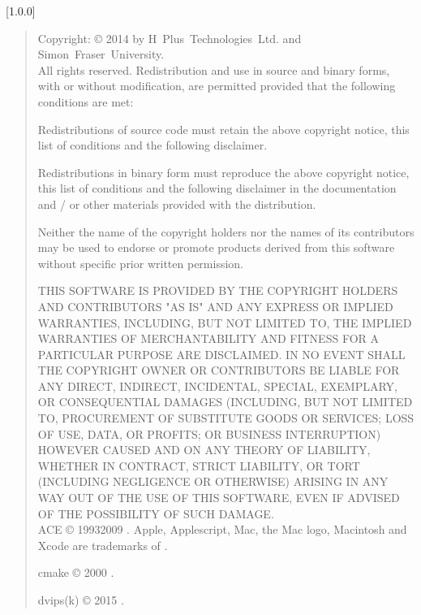 [1.0.0]
\begin{quote}
\begin{small}
Copyright: \copyright{} 2014 by H~Plus~Technologies~Ltd. and Simon~Fraser~University.
\\
All rights reserved. Redistribution and use in source and binary forms, with or without
modification, are permitted provided that the following conditions are met:
\begin{tightItems}
\item Redistributions of source code must retain the above copyright notice, this list of
conditions and the following disclaimer.
\item Redistributions in binary form must reproduce the above copyright notice, this list
of conditions and the following disclaimer in the documentation and / or other materials
provided with the distribution.
\item Neither the name of the copyright holders nor the names of its contributors may be
used to endorse or promote products derived from this software without specific prior
written permission.
\end{tightItems}
THIS SOFTWARE IS PROVIDED BY THE COPYRIGHT HOLDERS AND CONTRIBUTORS "AS IS" AND ANY
EXPRESS OR IMPLIED WARRANTIES, INCLUDING, BUT NOT LIMITED TO, THE IMPLIED WARRANTIES OF
MERCHANTABILITY AND FITNESS FOR A PARTICULAR PURPOSE ARE DISCLAIMED.
IN NO EVENT SHALL THE COPYRIGHT OWNER OR CONTRIBUTORS BE LIABLE FOR ANY DIRECT, INDIRECT,
INCIDENTAL, SPECIAL, EXEMPLARY, OR CONSEQUENTIAL DAMAGES (INCLUDING, BUT NOT LIMITED TO,
PROCUREMENT OF SUBSTITUTE GOODS OR SERVICES; LOSS OF USE, DATA, OR PROFITS; OR BUSINESS
INTERRUPTION) HOWEVER CAUSED AND ON ANY THEORY OF LIABILITY, WHETHER IN CONTRACT, STRICT
LIABILITY, OR TORT (INCLUDING NEGLIGENCE OR OTHERWISE) ARISING IN ANY WAY OUT OF THE USE
OF THIS SOFTWARE, EVEN IF ADVISED OF THE POSSIBILITY OF SUCH DAMAGE.\\

ACE \copyright{} 1993\longDash{}2009
.
Apple, Applescript, Mac, the Mac logo, Macintosh and Xcode are trademarks of
.

cmake \copyright{} 2000
.

dvips(k) \copyright{} 2015
.


\end{small}
\end{quote}
